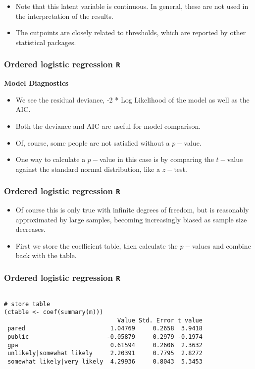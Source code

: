 \documentclass[00-GLMregslides.tex]{subfiles}
\begin{document}
\begin{frame}
\begin{frame}[fragile]
\begin{itemize}
\item Note that this latent variable is continuous. In general, these are not used in the interpretation of the results. \item  The cutpoints are closely related to thresholds, which are reported by other statistical packages.
\end{itemize}
\end{frame}
\begin{frame}[fragile]
	\frametitle{Ordered logistic regression \texttt{R} }
	\Large
\textbf{Model Diagnostics}
\begin{itemize}
\item We see the residual deviance, -2 * Log Likelihood of the model as well as the AIC. 
\item Both the deviance and AIC are useful for model comparison.
\item Of, course, some people are not satisfied without a $p-$value.
\item One way to calculate a $p-$value in this case is by comparing the $t-$value against the standard normal distribution, like a $z-$test. 
\end{itemize}
\end{frame}
\begin{frame}[fragile]
	\frametitle{Ordered logistic regression \texttt{R} }
	\Large
\begin{itemize}
\item Of course this is only true with infinite degrees of freedom, but is reasonably approximated by large 
samples, becoming increasingly biased as sample size decreases. 
\item First we store the coefficient table, then calculate the $p-$values and combine back with the table.
\end{itemize}
\end{frame}
\begin{frame}[fragile]
	\frametitle{Ordered logistic regression \texttt{R} }
\normalsize
	
	\begin{verbatim}
		
# store table
(ctable <- coef(summary(m)))
                                Value Std. Error t value
 pared                        1.04769     0.2658  3.9418
 public                      -0.05879     0.2979 -0.1974
 gpa                          0.61594     0.2606  2.3632
 unlikely|somewhat likely     2.20391     0.7795  2.8272
 somewhat likely|very likely  4.29936     0.8043  5.3453
 

\end{verbatim}
\end{frame}
\end{frame}
\end{document}
